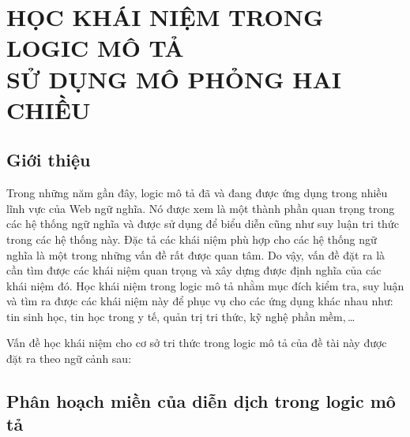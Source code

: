 \chapter[Học khái niệm trong logic mô tả sử dụng mô phỏng hai~chiều]{HỌC KHÁI NIỆM TRONG LOGIC MÔ TẢ\\SỬ DỤNG MÔ PHỎNG HAI CHIỀU} 
\label{Chapter3}
\thispagestyle{fancy}

\section{Giới thiệu}
\label{sec:Chap3.Introduction}
Trong những năm gần đây, logic mô tả đã và đang được ứng dụng trong nhiều lĩnh vực của Web ngữ nghĩa. Nó được xem là một thành phần quan trọng trong các hệ thống ngữ nghĩa và được sử dụng để biểu diễn cũng như suy luận tri thức trong các hệ thống này. Đặc tả các khái niệm phù hợp cho các hệ thống ngữ nghĩa là một trong những vấn đề rất được quan tâm. Do vậy, vấn đề đặt ra là cần tìm được các khái niệm quan trọng và xây dựng được định nghĩa của các khái niệm đó. Học khái niệm trong logic mô tả nhằm mục đích kiểm tra, suy luận và tìm ra được các khái niệm này để phục vụ cho các ứng dụng khác nhau như: tin sinh học, tin học trong y tế, quản trị tri thức, kỹ nghệ phần mềm,\,\ldots

Vấn đề học khái niệm cho cơ sở tri thức trong logic mô tả của đề tài này được đặt ra theo ngữ cảnh sau:

\noindent
{}

\section{Phân hoạch miền của diễn dịch trong logic mô tả}

